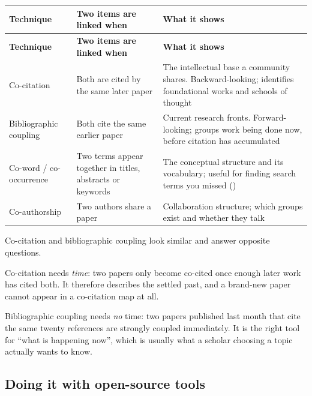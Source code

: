 \begin{center}
\small
\begin{longtable}{@{}L{3.2cm}L{5.0cm}L{6.0cm}@{}}
\toprule
\textbf{Technique} & \textbf{Two items are linked when} & \textbf{What it shows} \\
\midrule
\endfirsthead
\toprule
\textbf{Technique} & \textbf{Two items are linked when} & \textbf{What it shows} \\
\midrule
\endhead
\bottomrule
\endfoot
Co-citation
  & Both are cited by the same later paper
  & The intellectual base a community shares. Backward-looking; identifies
    foundational works and schools of thought \\
Bibliographic coupling
  & Both cite the same earlier paper
  & Current research fronts. Forward-looking; groups work being done now,
    before citation has accumulated \\
Co-word / co-occurrence
  & Two terms appear together in titles, abstracts or keywords
  & The conceptual structure and its vocabulary; useful for finding search
    terms you missed () \\
Co-authorship
  & Two authors share a paper
  & Collaboration structure; which groups exist and whether they talk \\
\end{longtable}
\end{center}

\begin{conceptbox}
Co-citation and bibliographic coupling look similar and answer opposite
questions.

\medskip
Co-citation needs \emph{time}: two papers only become co-cited once enough
later work has cited both. It therefore describes the settled past, and a
brand-new paper cannot appear in a co-citation map at all.

\medskip
Bibliographic coupling needs \emph{no} time: two papers published last month
that cite the same twenty references are strongly coupled immediately. It is
the right tool for ``what is happening now'', which is usually what a scholar
choosing a topic actually wants to know.
\end{conceptbox}

\subsection{Doing it with open-source tools}

